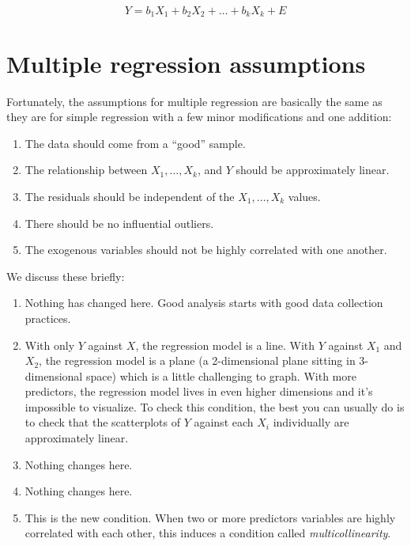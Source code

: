 \documentclass[
]{book}
\providecommand{\tightlist}{%
  \setlength{\itemsep}{0pt}\setlength{\parskip}{0pt}}
\begin{document}
\[
Y = b_{1}X_{1} + b_{2}X_{2}  + \dots + b_{k}X_{k} + E
\]

\hypertarget{multiple-assumptions}{%
\section{Multiple regression assumptions}\label{multiple-assumptions}}

Fortunately, the assumptions for multiple regression are basically the same as they are for simple regression with a few minor modifications and one addition:

\begin{enumerate}
\def\labelenumi{\arabic{enumi}.}
\tightlist
\item
  The data should come from a ``good'' sample.
\item
  The relationship between \(X_{1}, \dots, X_{k}\), and \(Y\) should be approximately linear.
\item
  The residuals should be independent of the \(X_{1}, \dots, X_{k}\) values.
\item
  There should be no influential outliers.
\item
  The exogenous variables should not be highly correlated with one another.
\end{enumerate}

We discuss these briefly:

\begin{enumerate}
\def\labelenumi{\arabic{enumi}.}
\tightlist
\item
  Nothing has changed here. Good analysis starts with good data collection practices.
\item
  With only \(Y\) against \(X\), the regression model is a line. With \(Y\) against \(X_{1}\) and \(X_{2}\), the regression model is a plane (a 2-dimensional plane sitting in 3-dimensional space) which is a little challenging to graph. With more predictors, the regression model lives in even higher dimensions and it's impossible to visualize. To check this condition, the best you can usually do is to check that the scatterplots of \(Y\) against each \(X_{i}\) individually are approximately linear.
\item
  Nothing changes here.
\item
  Nothing changes here.
\item
  This is the new condition. When two or more predictors variables are highly correlated with each other, this induces a condition called \emph{multicollinearity}.
\end{enumerate}
\end{document}
